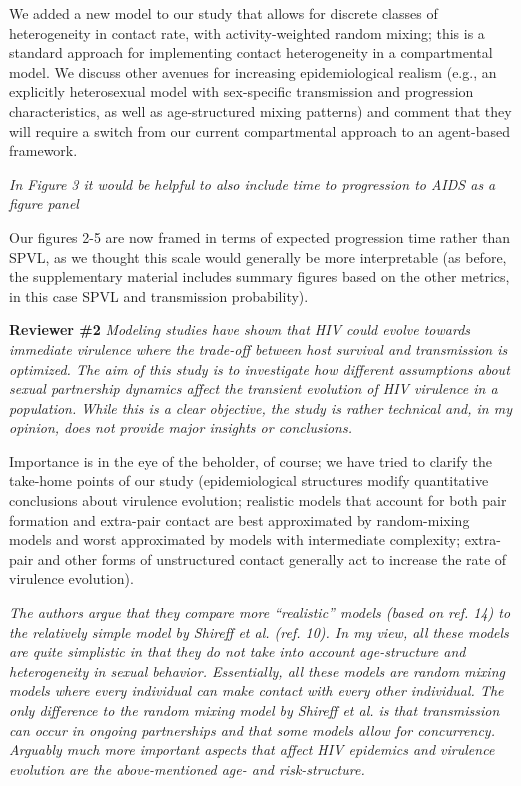 \documentclass[10pt]{letter}
\newcommand{\revcomment}[1]{\emph{#1}}
\newcommand{\response}[1]{#1}
\begin{document}
\begin{letter}{
}
\response{We added a new model to our study that allows for 
discrete classes of heterogeneity 
in contact rate, with activity-weighted random mixing; this
is a standard approach for implementing contact heterogeneity
in a compartmental model. We discuss other avenues for
increasing epidemiological realism (e.g., an explicitly
heterosexual model with sex-specific transmission and
progression characteristics, as well as age-structured
mixing patterns) and comment that they will require a
switch from our current compartmental approach to an agent-based
framework.}

\revcomment{In Figure 3 it would be helpful to also include time to progression to
AIDS as a figure panel}

\response{Our figures 2-5 are now framed in terms of expected
progression time rather than SPVL, as we thought this scale
would generally be more interpretable (as before, the supplementary
material includes summary figures based on the other metrics, in this
case SPVL and transmission probability).}

\textbf{Reviewer \#2}
\revcomment{Modeling studies have shown that HIV could evolve towards
immediate virulence where the trade-off between host survival and
transmission is optimized. The aim of this study is to investigate how
different assumptions about sexual partnership dynamics affect the
transient evolution of HIV virulence in a population. While this is a
clear objective, the study is rather technical and, in my opinion, does
not provide major insights or conclusions.
}

\response{Importance is in the eye of the beholder, of course; we
have tried to clarify the take-home points of our study
(epidemiological structures modify quantitative conclusions about
virulence evolution; realistic models that account for both
pair formation and extra-pair contact are best approximated by
random-mixing models and worst approximated by models with
intermediate complexity; extra-pair and other forms of unstructured
contact generally act to increase the rate of virulence evolution).
}


\revcomment{
The authors argue that they compare more “realistic” models (based on
ref. 14) to the relatively simple model by Shireff et al. (ref. 10). In
my view, all these models are quite simplistic in that they do not take
into account age-structure and heterogeneity in sexual behavior.
Essentially, all these models are random mixing models where every
individual can make contact with every other individual. The only
difference to the random mixing model by Shireff et al. is that
transmission can occur in ongoing partnerships and that some models
allow for concurrency. 
Arguably much more important aspects that affect
HIV epidemics and virulence evolution are the above-mentioned age- and
risk-structure.}


\end{letter}
\end{document}
